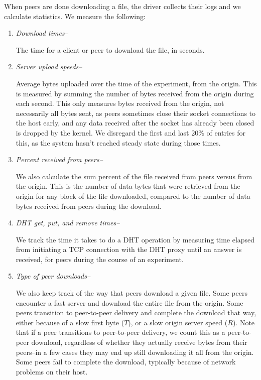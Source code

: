 When peers are done downloading a file, the driver collects their logs and we calculate statistics.  We measure 
the following:

\begin{enumerate}

\item \emph{Download times--}

The time for a client or peer to download the file, in seconds.

\item \emph{Server upload speeds--}

Average bytes uploaded over the time of the experiment, from the origin.
This is measured by summing the number of bytes received from the origin during each second.  
This only measures bytes received from the origin, not necessarily all bytes sent, 
as peers sometimes close their socket connections to the host early, and any data received after the socket has already been closed is dropped by the kernel.  
We disregard the first and last 20\% of entries for this, as the system hasn't reached steady state during those times.

\item \emph{Percent received from peers--}

We also calculate the sum percent of the file received from peers versus from the origin.  This is the number of data bytes that were retrieved
from the origin for any block of the file downloaded, compared to the number of data bytes received from peers during the download.

\item \emph{DHT get, put, and remove times--}

We track the time it takes to do a DHT operation by measuring time elapsed from initiating a TCP connection with the DHT proxy 
until an answer is received, for peers during the course of an experiment.

\item \emph{Type of peer downloads--}

We also keep track of the way that peers download a given file.  Some peers encounter a fast server and download the entire file from the origin.
Some peers transition to peer-to-peer delivery and complete the download that way, either because of a slow first byte ($T$), 
or a slow origin server speed ($R$).  Note that if a peer transitions to peer-to-peer delivery, we count this as
a peer-to-peer download, regardless of whether they actually receive bytes from their peers--in a few cases they may end up still downloading
it all from the origin.  Some peers fail to complete the download, typically because of network problems on their host.

\end{enumerate}

